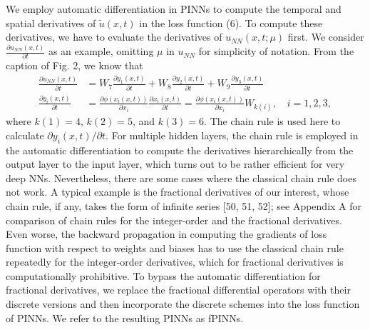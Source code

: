\documentclass[UTF8]{article}
\begin{document}
We employ automatic differentiation in PINNs to compute the temporal and spatial derivatives of $\tilde{u}(x, t)$ in the loss function (6). To compute these derivatives, we have to evaluate the derivatives of $u_{NN}(x, t; \mu)$ first. We consider $\frac{\partial u_{NN}(x, t)}{\partial t}$ as an example, omitting $\mu$ in $u_{NN}$ for simplicity of notation. From the caption of Fig. 2, we know that
\begin{equation}
\begin{aligned}
\frac{\partial u_{NN}(x, t)}{\partial t} &= W_7 \frac{\partial y_1(x, t)}{\partial t} + W_8 \frac{\partial y_2(x, t)}{\partial t} + W_9 \frac{\partial y_3(x, t)}{\partial t} \\
\frac{\partial y_i(x, t)}{\partial t} &= \frac{\partial \phi(x_i(x, t))}{\partial x_i} \frac{\partial x_i(x, t)}{\partial t} = \frac{\partial \phi(x_i(x, t))}{\partial x_i} W_{k(i)}, \quad i = 1, 2, 3,
\end{aligned}
\end{equation}
where $k(1) = 4$, $k(2) = 5$, and $k(3) = 6$. The chain rule is used here to calculate $\partial y_i(x, t)/\partial t$. For multiple hidden layers, the chain rule is employed in the automatic differentiation to compute the derivatives hierarchically from the output layer to the input layer, which turns out to be rather efficient for very deep NNs. Nevertheless, there are some cases where the classical chain rule does not work. A typical example is the fractional derivatives of our interest, whose chain rule, if any, takes the form of infinite series [50, 51, 52]; see Appendix A for comparison of chain rules for the integer-order and the fractional derivatives. Even worse, the backward propagation in computing the gradients of loss function with respect to weights and biases has to use the classical chain rule repeatedly for the integer-order derivatives, which for fractional derivatives is computationally prohibitive. To bypass the automatic differentiation for fractional derivatives, we replace the fractional differential operators with their discrete versions and then incorporate the discrete schemes into the loss function of PINNs. We refer to the resulting PINNs as fPINNs.
\end{document}
